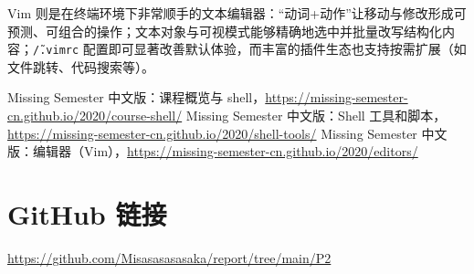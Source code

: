 \documentclass[a4paper,12pt]{ctexart}
\begin{document}
\vspace{14pt}

Vim 则是在终端环境下非常顺手的文本编辑器：“动词+动作”让移动与修改形成可预测、可组合的操作；文本对象与可视模式能够精确地选中并批量改写结构化内容；\texttt{\~/.vimrc} 配置即可显著改善默认体验，而丰富的插件生态也支持按需扩展（如文件跳转、代码搜索等）。






\newpage

\begin{thebibliography}{9}
 Missing Semester 中文版：课程概览与 shell，\url{https://missing-semester-cn.github.io/2020/course-shell/}
 Missing Semester 中文版：Shell 工具和脚本，\url{https://missing-semester-cn.github.io/2020/shell-tools/}
 Missing Semester 中文版：编辑器（Vim），\url{https://missing-semester-cn.github.io/2020/editors/}
\end{thebibliography}


\section*{GitHub 链接}
\begin{center}
\href{https://github.com/Misasasasasaka/report}{https://github.com/Misasasasasaka/report/tree/main/P2}
\end{center}
\end{document}
